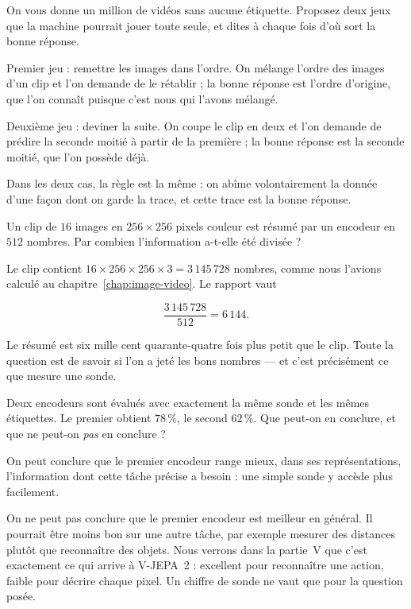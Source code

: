 \begin{exercice}
On vous donne un million de vidéos sans aucune étiquette. Proposez deux jeux
que la machine pourrait jouer toute seule, et dites à chaque fois d'où sort
la bonne réponse.
\end{exercice}

\begin{solution}
Premier jeu : remettre les images dans l'ordre. On mélange l'ordre des images
d'un clip et l'on demande de le rétablir ; la bonne réponse est l'ordre
d'origine, que l'on connaît puisque c'est nous qui l'avons mélangé.

Deuxième jeu : deviner la suite. On coupe le clip en deux et l'on demande de
prédire la seconde moitié à partir de la première ; la bonne réponse est la
seconde moitié, que l'on possède déjà.

Dans les deux cas, la règle est la même : on abîme volontairement la donnée
d'une façon dont on garde la trace, et cette trace est la bonne réponse.
\end{solution}

\begin{exercice}
Un clip de $16$ images en $256 \times 256$ pixels couleur est résumé par un
encodeur en $512$ nombres. Par combien l'information a-t-elle été divisée ?
\end{exercice}

\begin{solution}
Le clip contient $16 \times 256 \times 256 \times 3 = 3\,145\,728$ nombres,
comme nous l'avions calculé au chapitre~\ref{chap:image-video}. Le rapport
vaut

\[
  \frac{3\,145\,728}{512} = 6\,144 .
\]

Le résumé est six mille cent quarante-quatre fois plus petit que le clip. Toute la
question est de savoir si l'on a jeté les bons nombres — et c'est précisément
ce que mesure une sonde.
\end{solution}

\begin{exercice}
Deux encodeurs sont évalués avec exactement la même sonde et les mêmes
étiquettes. Le premier obtient $78\,\%$, le second $62\,\%$. Que peut-on en
conclure, et que ne peut-on \emph{pas} en conclure ?
\end{exercice}

\begin{solution}
On peut conclure que le premier encodeur range mieux, dans ses
représentations, l'information dont cette tâche précise a besoin : une simple
sonde y accède plus facilement.

On ne peut pas conclure que le premier encodeur est meilleur en général. Il
pourrait être moins bon sur une autre tâche, par exemple mesurer des
distances plutôt que reconnaître des objets. Nous verrons dans la partie~V
que c'est exactement ce qui arrive à V-JEPA~2 : excellent pour reconnaître une
action, faible pour décrire chaque pixel. Un chiffre de sonde ne vaut que
pour la question posée.
\end{solution}

